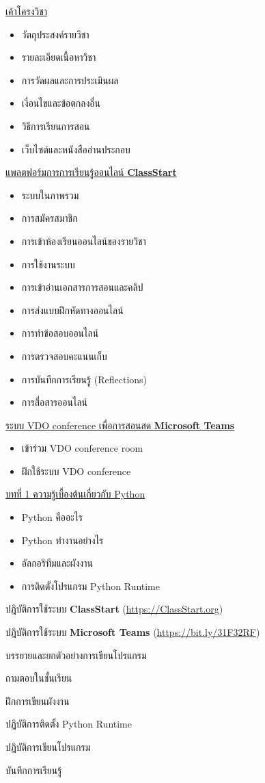 {
\underline{เค้าโครงวิชา}

\begin{itemize}
\item วัตถุประสงค์รายวิชา
\item รายละเอียดเนื้อหาวิชา
\item การวัดผลและการประเมินผล
\item เงื่อนไขและข้อตกลงอื่น
\item วิธีการเรียนการสอน
\item เว็บไซต์และหนังสืออ่านประกอบ
\end{itemize}

\underline{แพลตฟอร์มการการเรียนรู้ออนไลน์ \textbf{ClassStart}}
\begin{itemize}
\item ระบบในภาพรวม
\item การสมัครสมาชิก
\item การเข้าห้องเรียนออนไลน์ของรายวิชา
\item การใช้งานระบบ
\item การเข้าอ่านเอกสารการสอนและคลิป
\item การส่งแบบฝึกหัดทางออนไลน์
\item การทำข้อสอบออนไลน์
\item การตรวจสอบคะแนนเก็บ
\item การบันทึกการเรียนรู้ (Reflections)
\item การสื่อสารออนไลน์
\end{itemize}

\underline{ระบบ VDO conference เพื่อการสอนสด \textbf{Microsoft Teams}}
\begin{itemize}
\item เข้าร่วม VDO conference room
\item ฝึกใช้ระบบ VDO conference
\end{itemize}

\underline{บทที่ 1 ความรู้เบื้องต้นเกี่ยวกับ Python}
\begin{itemize}
\item Python คืออะไร
\item  Python ทำงานอย่างไร
\item  อัลกอริทึมและผังงาน
\item  การติดตั้งโปรแกรม Python Runtime
\end{itemize}
}
{
\item ปฎิบัติการใช้ระบบ \textbf{ClassStart} (\url{https://ClassStart.org})
\item ปฎิบัติการใช้ระบบ \textbf{Microsoft Teams} (\url{https://bit.ly/31F32RF})
\item บรรยายและยกตัวอย่างการเขียนโปรแกรม
\item  ถามตอบในชั้นเรียน
\item  ฝึกการเขียนผังงาน
\item  ปฏิบัติการติดตั้ง Python Runtime
\item  ปฏิบัติการเขียนโปรแกรม
\item  บันทึกการเรียนรู้
}


